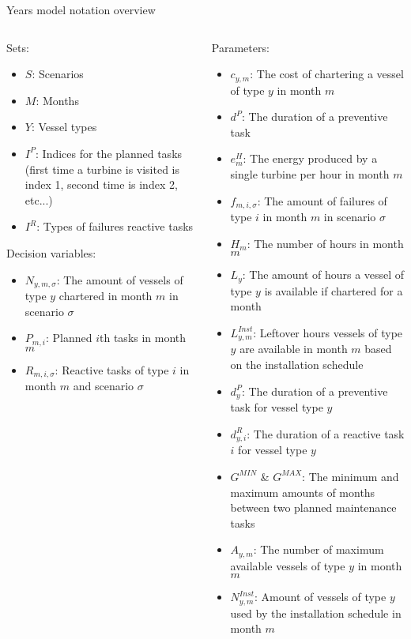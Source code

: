 \documentclass{beamer}
\begin{document}
\begin{frame}{Years model notation overview}
\tiny
\begin{columns}
\begin{column}{.48\textwidth}
Sets:
\begin{itemize}
\item $S$: Scenarios
\item $M$: Months
\item $Y$: Vessel types
\item $I^P$: Indices for the planned tasks (first time a turbine is visited is index 1, second time is index 2, etc...)
\item $I^R$: Types of failures reactive tasks
\end{itemize}

Decision variables:
\begin{itemize}
\item $N_{y,m,\sigma}$: The amount of vessels of type $y$ chartered in month $m$ in scenario $\sigma$
\item $P_{m,i}$: Planned $i$th tasks in month $m$
\item $R_{m,i,\sigma}$: Reactive tasks of type $i$ in month $m$ and scenario $\sigma$
\end{itemize}
\end{column}

\hfill

\begin{column}{.48\textwidth}
Parameters:
\begin{itemize}
\item $c_{y,m}$: The cost of chartering a vessel of type $y$ in month $m$
\item $d^P$: The duration of a preventive task
\item $e^H_m$: The energy produced by a single turbine per hour in month $m$
\item $f_{m,i,\sigma}$: The amount of failures of type $i$ in month $m$ in scenario $\sigma$
\item $H_m$: The number of hours in month $m$
\item $L_y$: The amount of hours a vessel of type $y$ is available if chartered for a month
\item $L^{Inst}_{y,m}$: Leftover hours vessels of type $y$ are available in month $m$ based on the installation schedule
\item $d^P_y$: The duration of a preventive task for vessel type $y$
\item $d^R_{y,i}$: The duration of a reactive task $i$ for vessel type $y$
\item $G^{MIN}$ \& $G^{MAX}$: The minimum and maximum amounts of months between two planned maintenance tasks
\item $A_{y,m}$: The number of maximum available vessels of type $y$ in month $m$
\item $N^{Inst}_{y,m}$: Amount of vessels of type $y$ used by the installation schedule in month $m$
\end{itemize}
\end{column}
\end{columns}
\end{frame}
\end{document}

